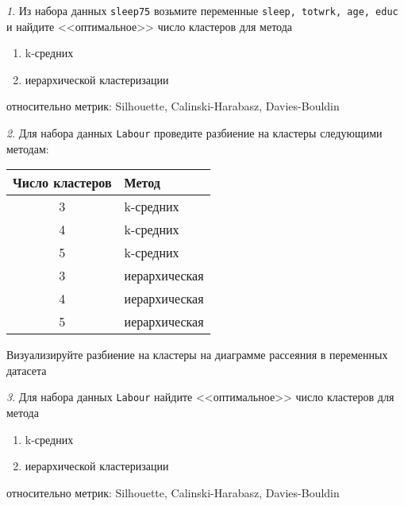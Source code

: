 \documentclass[12pt]{article}
\theoremstyle{remark}
\newtheorem{exercise}{}[section]
\begin{document}
\begin{exercise}
Из набора данных \texttt{sleep75} возьмите переменные 
\texttt{sleep, totwrk, age, educ} и найдите <<оптимальное>> число кластеров
для метода
\begin{enumerate}
	\item k-средних
	\item иерархической кластеризации
\end{enumerate}
относительно метрик: Silhouette, Calinski-Harabasz, Davies-Bouldin
\end{exercise}

\begin{exercise}
Для набора данных \texttt{Labour} проведите разбиение на кластеры следующими
методам:
\begin{center}
	\begin{tabular}{c|l}
		Число кластеров & Метод \\ \hline
		3 & k-средних \\
		4 & k-средних \\
		5 & k-средних \\
		3 & иерархическая \\
		4 & иерархическая \\
		5 & иерархическая \\ \hline
	\end{tabular}
\end{center}
Визуализируйте разбиение на кластеры на диаграмме рассеяния в переменных датасета
\end{exercise}
	
\begin{exercise}
Для набора данных \texttt{Labour} найдите <<оптимальное>> число кластеров
для метода
\begin{enumerate}
	\item k-средних
	\item иерархической кластеризации
\end{enumerate}
относительно метрик: Silhouette, Calinski-Harabasz, Davies-Bouldin
\end{exercise}
\end{document}
